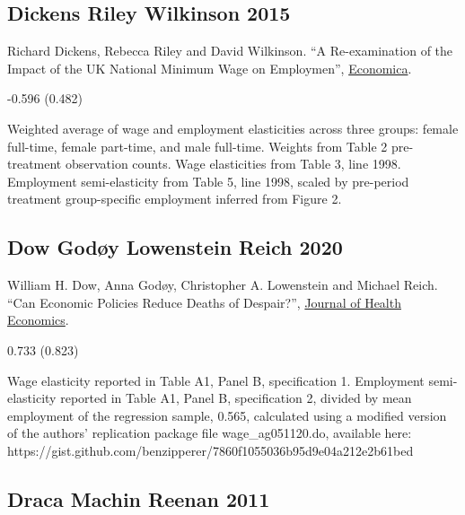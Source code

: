 \subsection*{Dickens Riley Wilkinson 2015}
\vspace{-0.7em}

\noindent Richard Dickens, Rebecca Riley and David Wilkinson. ``A Re-examination of the Impact of the UK National Minimum Wage on Employmen'', \href{https://doi.org/10.1111/ecca.12158}{Economica}.

\vspace{0.7em}

 -0.596 (0.482)

\vspace{0.7em}

 Weighted average of wage and employment elasticities across three groups: female full-time, female part-time, and male full-time. Weights from Table 2 pre-treatment observation counts. Wage elasticities from Table 3, line 1998. Employment semi-elasticity from Table 5, line 1998, scaled by pre-period treatment group-specific employment inferred from Figure 2.

\subsection*{Dow Godøy Lowenstein Reich 2020}
\vspace{-0.7em}

\noindent William H. Dow, Anna Godøy, Christopher A. Lowenstein and Michael Reich. ``Can Economic Policies Reduce Deaths of Despair?'', \href{https://doi.org/10.1016/j.jhealeco.2020.102372}{Journal of Health Economics}.

\vspace{0.7em}

 0.733 (0.823)

\vspace{0.7em}

 Wage elasticity reported in Table A1, Panel B, specification 1. Employment semi-elasticity reported in Table A1, Panel B, specification 2, divided by mean employment of the regression sample, 0.565, calculated using a modified version of the authors' replication package file wage\_ag051120.do, available here: https://gist.github.com/benzipperer/7860f1055036b95d9e04a212e2b61bed

\subsection*{Draca Machin Reenan 2011}
\vspace{-0.7em}

